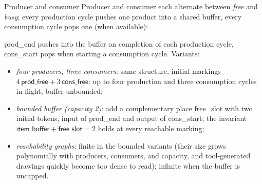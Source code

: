 \begin{examplebox}{Producer and consumer}
Producer and consumer each alternate between \emph{free} and \emph{busy}; every production cycle pushes one product into a shared buffer, every consumption cycle pops one (when available):
\begin{center}
\end{center}
\textsf{prod\_end} pushes into the buffer on completion of each production cycle, \textsf{cons\_start} pops when starting a consumption cycle. Variants:
\begin{itemize}
  \item \emph{four producers, three consumers}: same structure, initial markings $4\,\textsf{prod\_free} + 3\,\textsf{cons\_free}$: up to four production and three consumption cycles in flight, buffer unbounded;
  \item \emph{bounded buffer (capacity 2)}: add a complementary place \textsf{free\_slot} with two initial tokens, input of \textsf{prod\_end} and output of \textsf{cons\_start}; the invariant $\textsf{item\_buffer} + \textsf{free\_slot} = 2$ holds at every reachable marking;
  \item \emph{reachability graphs}: finite in the bounded variants (their size grows polynomially with producers, consumers, and capacity, and tool-generated drawings quickly become too dense to read); infinite when the buffer is uncapped.
\end{itemize}
\end{examplebox}


